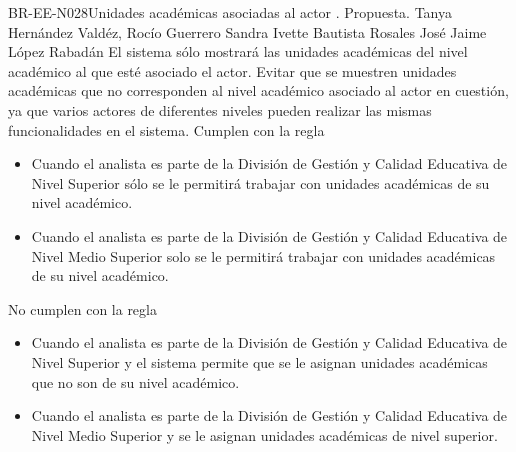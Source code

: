 \begin{BusinessRule}{BR-EE-N028}{Unidades académicas asociadas al actor}
	{\bcCondition}    %
	{\btEnabler}     %
	{\blControlling}    %
	.
	\BRItem[Estado] Propuesta.
	 Tanya Hernández Valdéz, Rocío Guerrero
	 Sandra Ivette Bautista Rosales
	 José Jaime López Rabadán
	\BRItem[Descripción] El sistema sólo mostrará las unidades académicas del nivel académico al que esté asociado el actor.
	\BRItem[Motivación] Evitar que se muestren unidades académicas que no corresponden al nivel académico asociado al actor en cuestión, ya que varios actores de diferentes niveles pueden realizar las mismas funcionalidades en el sistema.
	 Cumplen con la regla
	\begin{itemize}
		\item Cuando el analista es parte de la División de Gestión y Calidad Educativa de Nivel Superior sólo se le permitirá trabajar con unidades académicas de su nivel académico.
		\item Cuando el analista es parte de la División de Gestión y Calidad Educativa de Nivel Medio Superior solo se le permitirá trabajar con unidades académicas de su nivel académico.
	\end{itemize}
	 No cumplen con la regla
	\begin{itemize}
		\item Cuando el analista es parte de la División de Gestión y Calidad Educativa de Nivel Superior y el sistema permite que se le asignan unidades académicas que no son de su nivel académico.
		\item Cuando el analista es parte de la División de Gestión y Calidad Educativa de Nivel Medio Superior y se le asignan unidades académicas de nivel superior.
	\end{itemize}
	
\end{BusinessRule}



